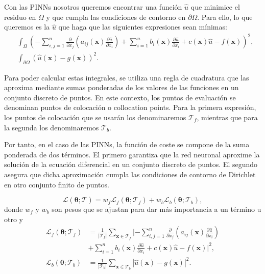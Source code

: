 \documentclass[a4paper,11pt,spanish, twoside, leqno]{tfg-uam}
\theoremstyle{definition}
\begin{document}
Con las PINNs nosotros queremos encontrar una función $\hat{u}$ que minimice el residuo en $\Omega$ y que cumpla las condiciones de contorno en $\partial\Omega$. Para ello, lo que queremos es la $\hat{u}$ que haga que las siguientes expresiones sean mínimas:
\begin{align*}
    &\int_{\Omega} \left( -\sum_{i,j=1}^{n} \frac{\partial}{\partial x_j}\left( a_{ij}(\mathbf{x})\frac{\partial \hat{u}}{\partial x_i}\right) + \sum_{i=1}^{n} b_i(\mathbf{x})\frac{\partial \hat{u}}{\partial x_i} + c(\mathbf{x})\hat{u} - f(\mathbf{x}) \right)^2, \\ 
    &\int_{\partial\Omega} \left( \hat{u} (\mathbf{x}) - g(\mathbf{x})\right)^2.
\end{align*}

Para poder calcular estas integrales, se utiliza una regla de cuadratura que las aproxima mediante sumas ponderadas de los valores de las funciones en un conjunto discreto de puntos. En este contexto, los puntos de evaluación se denominan puntos de colocación o collocation points. Para la primera expresión, los puntos de colocación que se usarán los denominaremos $\mathcal{T}_f$, mientras que para la segunda los denominaremos $\mathcal{T}_b$. 

Por tanto, en el caso de las PINNs, la función de coste se compone de la suma ponderada de dos términos. El primero garantiza que la red neuronal aproxime la solución de la ecuación diferencial en un conjunto discreto de puntos. El segundo asegura que dicha aproximación cumpla las condiciones de contorno de Dirichlet en otro conjunto finito de puntos.

\begin{equation} \label{eq:L_PINN}
    \mathcal{L}(\boldsymbol{\theta}; \mathcal{T}) = w_f \mathcal{L}_f(\boldsymbol{\theta}; \mathcal{T}_f) + w_b \mathcal{L}_b(\boldsymbol{\theta}; \mathcal{T}_b),
\end{equation}
donde $w_f$ y $w_b$ son pesos que se ajustan para dar más importancia a un término u otro y
\begin{equation}
    \label{eq:Lf_Lb}
    \begin{split}
        \mathcal{L}_f(\boldsymbol{\theta}; \mathcal{T}_f) &= \frac{1}{|\mathcal{T}_f|} \sum_{\mathbf{x} \in \mathcal{T}_f} | -\sum_{i,j=1}^{n} \frac{\partial}{\partial x_j}\left( a_{ij}(\mathbf{x})\frac{\partial \hat{u}}{\partial x_i}\right) \\ &+ \sum_{i=1}^{n} b_i(\mathbf{x})\frac{\partial \hat{u}}{\partial x_i} + c(\mathbf{x})\hat{u} - f(\mathbf{x}) |^2, \\ 
        \mathcal{L}_b(\boldsymbol{\theta}; \mathcal{T}_b) &= \frac{1}{|\mathcal{T}_b|} \sum_{\mathbf{x} \in \mathcal{T}_b} \left| \hat{u} (\mathbf{x}) - g(\mathbf{x})\right|^2.
    \end{split}
\end{equation}
\end{document}
